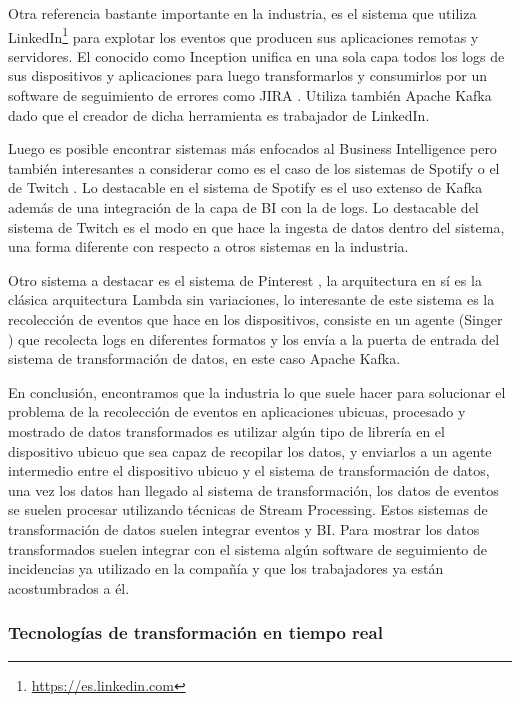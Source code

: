 Otra referencia bastante importante en la industria, es el sistema que utiliza LinkedIn\footnote{\href{https://es.linkedin.com}{https://es.linkedin.com}} para explotar los eventos que producen sus aplicaciones remotas y servidores. El conocido como Inception \cite{Tfg:inception} unifica en una sola capa todos los logs de sus dispositivos y aplicaciones para luego transformarlos y consumirlos por un software de seguimiento de errores como JIRA \cite{Tfg:jira}. Utiliza también Apache Kafka dado que el creador de dicha herramienta es trabajador de LinkedIn.

Luego es posible encontrar sistemas más enfocados al Business Intelligence pero también interesantes a considerar como es el caso de los sistemas de Spotify \cite{Tfg:spotify} o el de Twitch \cite{Tfg:twitch}. Lo destacable en el sistema de Spotify es el uso extenso de Kafka además de una integración de la capa de BI con la de logs. Lo destacable del sistema de Twitch es el modo en que hace la ingesta de datos dentro del sistema, una forma diferente con respecto a otros sistemas en la industria.

Otro sistema a destacar es el sistema de Pinterest \cite{Tfg:pinterest}, la arquitectura en sí es la clásica arquitectura Lambda sin variaciones, lo interesante de este sistema es la recolección de eventos que hace en los dispositivos, consiste en un agente (Singer \cite{Tfg:singer}) que recolecta logs en diferentes formatos y los envía a la puerta de entrada del sistema de transformación de datos, en este caso Apache Kafka.

En conclusión, encontramos que la industria lo que suele hacer para solucionar el problema de la recolección de eventos en aplicaciones ubicuas, procesado y mostrado de datos transformados es utilizar algún tipo de librería en el dispositivo ubicuo que sea capaz de recopilar los datos, y enviarlos a un agente intermedio entre el dispositivo ubicuo y el sistema de transformación de datos, una vez los datos han llegado al sistema de transformación, los datos de eventos se suelen procesar utilizando técnicas de Stream Processing. Estos sistemas de transformación de datos suelen integrar eventos y BI. Para mostrar los datos transformados suelen integrar con el sistema algún software de seguimiento de incidencias ya utilizado en la compañía y que los trabajadores ya están acostumbrados a él.

\subsubsection{Tecnologías de transformación en tiempo real}

